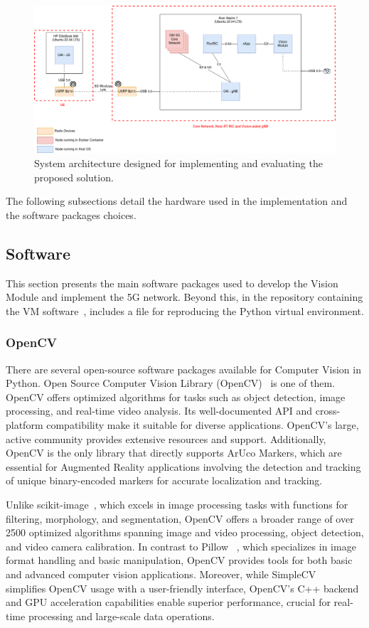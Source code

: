 \begin{figure}[H]
    \centering
    \includegraphics[width=0.75\linewidth]{figures/System Arch.drawio(4)}
    \caption[System architecture designed for implementing and evaluating the proposed solution]{System architecture designed for implementing and evaluating the proposed solution.}
    \label{fig:design_arch}
\end{figure}

The following subsections detail the hardware used in the implementation and the software packages choices.


\subsection{Software}\label{subsec:software}
This section presents the main software packages used to develop the Vision Module and implement the 5G network.
Beyond this, in the repository containing the VM software~\cite{repository}, includes a file for reproducing the Python virtual environment.


\subsubsection{OpenCV}
There are several open-source software packages available for Computer Vision in Python.
Open Source Computer Vision Library (OpenCV)~\cite{opencv} is one of them.
OpenCV offers optimized algorithms for tasks such as object detection, image processing, and real-time video analysis.
Its well-documented API and cross-platform compatibility make it suitable for diverse applications.
OpenCV's large, active community provides extensive resources and support.
Additionally, OpenCV is the only library that directly supports ArUco Markers, which are essential for Augmented Reality applications involving the detection and tracking of unique binary-encoded markers for accurate localization and tracking.

Unlike scikit-image~\cite{Scikit-learn}, which excels in image processing tasks with functions for filtering, morphology, and segmentation, OpenCV offers a broader range of over 2500 optimized algorithms spanning image and video processing, object detection, and video camera calibration.
In contrast to Pillow ~\cite{pillow}, which specializes in image format handling and basic manipulation, OpenCV provides tools for both basic and advanced computer vision applications.
Moreover, while SimpleCV~\cite{simplecv} simplifies OpenCV usage with a user-friendly interface, OpenCV's C++ backend and GPU acceleration capabilities enable superior performance, crucial for real-time processing and large-scale data operations.

